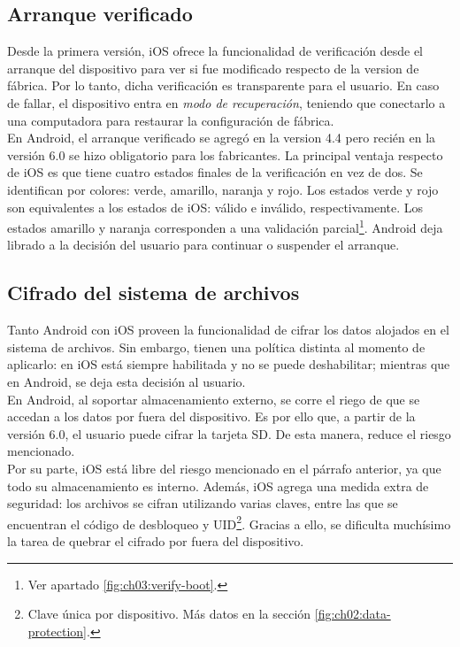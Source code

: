 \subsection{Arranque verificado}
Desde la primera versión, iOS ofrece la funcionalidad de verificación desde el arranque del dispositivo para ver si fue modificado respecto de la version de fábrica. Por lo tanto, dicha verificación es transparente para el usuario. En caso de fallar, el dispositivo entra en \emph{modo de recuperación}, teniendo que conectarlo a una computadora para restaurar la configuración de fábrica.\\

En Android, el arranque verificado se agregó en la version 4.4 pero recién en la versión 6.0 se hizo obligatorio para los fabricantes. La principal ventaja respecto de iOS es que tiene cuatro estados finales de la verificación en vez de dos. Se identifican por colores: verde, amarillo, naranja y rojo. Los estados verde y rojo son equivalentes a los estados de iOS: válido e inválido, respectivamente. Los estados amarillo y naranja corresponden a una validación parcial\footnote{Ver apartado \ref{fig:ch03:verify-boot}.}. Android deja librado a la decisión del usuario para continuar o suspender el arranque.
\subsection{Cifrado del sistema de archivos}
Tanto Android con iOS proveen la funcionalidad de cifrar los datos alojados en el sistema de archivos. Sin embargo, tienen una política distinta al momento de aplicarlo: en iOS está siempre habilitada y no se puede deshabilitar; mientras que en Android, se deja esta decisión al usuario.\\

En Android, al soportar almacenamiento externo, se corre el riego de que se accedan a los datos por fuera del dispositivo. Es por ello que, a partir de la versión 6.0, el usuario puede cifrar la tarjeta SD. De esta manera, reduce el riesgo mencionado.\\

Por su parte, iOS está libre del riesgo mencionado en el párrafo anterior, ya que todo su almacenamiento es interno. Además, iOS agrega una medida extra de seguridad: los archivos se cifran utilizando varias claves, entre las que se encuentran el código de desbloqueo y UID\footnote{Clave única por dispositivo. Más datos en la sección \ref{fig:ch02:data-protection}.}. Gracias a ello, se dificulta muchísimo la tarea de quebrar el cifrado por fuera del dispositivo.

